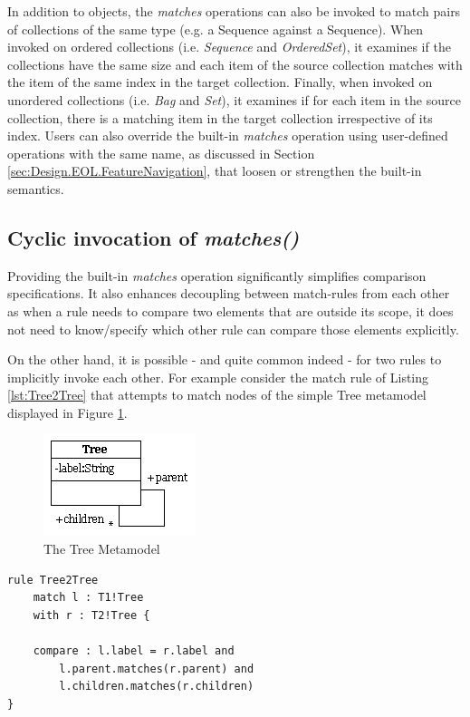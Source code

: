 In addition to objects, the \emph{matches} operations can also be invoked to match pairs of collections of the same type (e.g. a Sequence against a Sequence). When invoked on ordered collections (i.e. \emph{Sequence} and \emph{OrderedSet}), it examines if the collections have the same size and each item of the source collection matches with the item of the same index in the target collection. Finally, when invoked on unordered collections (i.e. \emph{Bag} and \emph{Set}), it examines if for each item in the source collection, there is a matching item in the target collection irrespective of its index. Users can also override the built-in \emph{matches} operation using user-defined operations with the same name, as discussed in Section \ref{sec:Design.EOL.FeatureNavigation}, that loosen or strengthen the built-in semantics.

\subsection{Cyclic invocation of \emph{matches()}}

Providing the built-in \emph{matches} operation significantly simplifies comparison specifications. It also enhances decoupling between match-rules from each other as when a rule needs to compare two elements that are outside its scope, it does not need to know/specify which other rule can compare those elements explicitly.

On the other hand, it is possible - and quite common indeed - for two rules to implicitly invoke each other. For example consider the match rule of Listing \ref{lst:Tree2Tree} that attempts to match nodes of the simple Tree metamodel displayed in Figure \ref{fig:Tree}.

\begin{figure}
	\centering
		\includegraphics{images/metamodels/Tree.png}
	\caption{The Tree Metamodel}
	\label{fig:Tree}
\end{figure}

\begin{lstlisting}[float=tbp, caption=The Tree2Tree rule, label=lst:Tree2Tree, language=ECL]
rule Tree2Tree 
	match l : T1!Tree
	with r : T2!Tree {
	
	compare : l.label = r.label and 
		l.parent.matches(r.parent) and
		l.children.matches(r.children)
}
\end{lstlisting}

